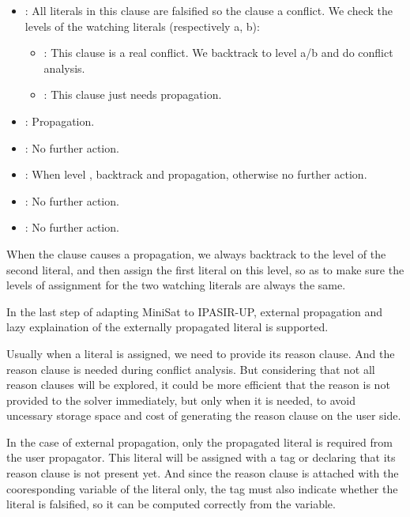 \begin{itemize}
  \item {}: All literals in this clause are falsified so the clause a conflict. We check the levels of the watching literals (respectively a, b):
  \begin{itemize}
    \item {}: This clause is a real conflict. We backtrack to level a/b and do conflict analysis.
    \item {}: This clause just needs propagation.
  \end{itemize}
  \item {}: Propagation.
  \item {}: No further action.
  \item {}: When level , backtrack and propagation, otherwise no further action.
  \item {}: No further action.
  \item {}: No further action.
\end{itemize}

When the clause causes a propagation, we always backtrack to the level of the second literal, and then assign the first literal on this level, so as to make sure the levels of assignment for the two watching literals are always the same.


In the last step of adapting MiniSat to IPASIR-UP, external propagation and lazy explaination of the externally propagated literal is supported.

Usually when a literal is assigned, we need to provide its reason clause. And the reason clause is needed during conflict analysis. But considering that not all reason clauses will be explored, it could be more efficient that the reason is not provided to the solver immediately, but only when it is needed, to avoid uncessary storage space and cost of generating the reason clause on the user side.

In the case of external propagation, only the propagated literal is required from the user propagator. This literal will be assigned with a tag  or  declaring that its reason clause is not present yet. And since the reason clause is attached with the cooresponding variable of the literal only, the tag must also indicate whether the literal is falsified, so it can be computed correctly from the variable.


